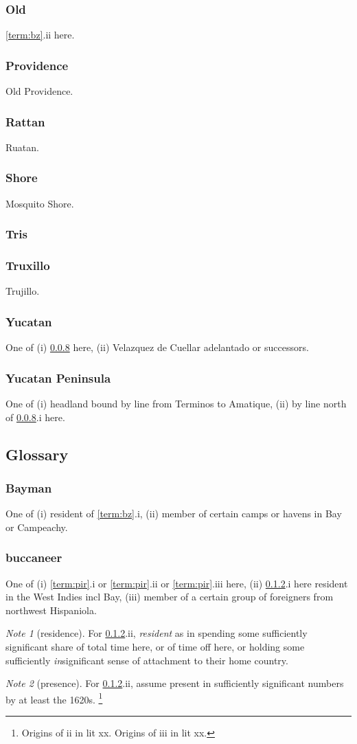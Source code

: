 \documentclass{amsart}
\theoremstyle{definition}%
\theoremstyle{definition}%
\theoremstyle{remark}%
\newtheorem*{note}{Note}
\theoremstyle{definition}%
\theoremstyle{definition}%
\begin{document}
\subsubsection{Old} \ref{term:bz}.ii here.
%
\subsubsection{Providence} Old Providence.
%
\subsubsection{Rattan} Ruatan.
%
\subsubsection{Shore} Mosquito Shore.
%
\subsubsection{Tris}
%
\subsubsection{Truxillo} Trujillo.
%
\subsubsection{Yucatan} One of (i) \ref{term:yucpen} here, (ii) Velazquez de Cuellar adelantado or successors.
%
\subsubsection{Yucatan Peninsula}\label{term:yucpen} One of (i) headland bound by line from Terminos to Amatique, (ii) by line north of \ref{term:yucpen}.i here.
%
\subsection{Glossary}
%
\subsubsection{Bayman} One of (i) resident of \ref{term:bz}.i, (ii) member of certain camps or havens in Bay or Campeachy.
%
\subsubsection{buccaneer}\label{term:bucc} One of (i) \ref{term:pir}.i or \ref{term:pir}.ii or \ref{term:pir}.iii here, (ii) \ref{term:bucc}.i here resident in the West Indies incl Bay, (iii) member of a certain group of foreigners from northwest Hispaniola.
%
	\begin{note}[residence]
	For \ref{term:bucc}.ii, \emph{resident} as in spending some sufficiently significant share of total time here, or of time off here, or holding some sufficiently \emph{in}significant sense of attachment to their home country.
	\end{note}
%
	\begin{note}[presence]
	For \ref{term:bucc}.ii, assume present in sufficiently significant numbers by at least the 1620s.%
	\footnote{Origins of ii in lit xx. Origins of iii in lit xx.}
	\end{note}
%
\end{document}
